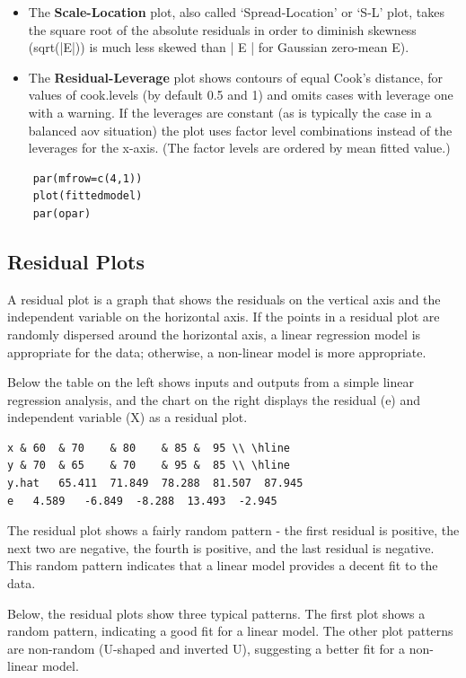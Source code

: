 \documentclass[Main.tex]{subfiles}
\begin{document}
\begin{itemize}
	\item
	The \textbf{Scale-Location} plot, also called ‘Spread-Location’ or ‘S-L’ plot, takes the square root of the absolute residuals in order to diminish skewness (sqrt(|E|)) is much less skewed than | E | for Gaussian zero-mean E).
	
	\item
	The \textbf{Residual-Leverage} plot shows contours of equal Cook's distance, for values of cook.levels (by default 0.5 and 1) and omits cases with leverage one with a warning. If the leverages are constant (as is typically the case in a balanced aov situation) the plot uses factor level combinations instead of the leverages for the x-axis. (The factor levels are ordered by mean fitted value.)
\end{itemize}
	\begin{verbatim}
	par(mfrow=c(4,1))
	plot(fittedmodel)
	par(opar)
	\end{verbatim}


\subsection{Residual Plots}
A residual plot is a graph that shows the residuals on the vertical axis and the independent variable on the horizontal axis. If the points in a residual plot are randomly dispersed around the horizontal axis, a linear regression model is appropriate for the data; otherwise, a non-linear model is more appropriate.

Below the table on the left shows inputs and outputs from a simple linear regression analysis, and the chart on the right displays the residual (e) and independent variable (X) as a residual plot.

\begin{verbatim}
x &	60	& 70	& 80	& 85 &	95 \\ \hline
y &	70	& 65	& 70	& 95 &	85 \\ \hline
y.hat	65.411	71.849	78.288	81.507	87.945
e	4.589	-6.849	-8.288	13.493	-2.945
\end{verbatim}


The residual plot shows a fairly random pattern - the first residual is positive, the next two are negative, the fourth is positive, and the last residual is negative. This random pattern indicates that a linear model provides a decent fit to the data.

Below, the residual plots show three typical patterns. The first plot shows a random pattern, indicating a good fit for a linear model. The other plot patterns are non-random (U-shaped and inverted U), suggesting a better fit for a non-linear model.





\end{document}
